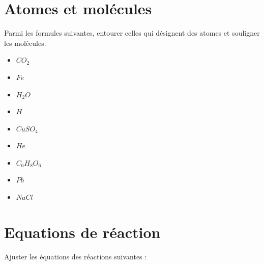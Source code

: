 \documentclass[a4paper,11pt]{exam}
\begin{document}
\section{Atomes et molécules}

Parmi les formules suivantes, entourer celles qui désignent des atomes et souligner les molécules.

\begin{multicols}{3}
	\begin{itemize}
		\item $CO_2$
		\item $Fe$
		\item $H_2O$
		\item $H$
		\item $CuSO_4$
		\item $He$
		\item $C_6H_8O_6 $
		\item $Pb$
		\item $NaCl$
		
	\end{itemize}
\end{multicols}


\section{Equations de réaction}

Ajuster les équations des réactions suivantes :
\end{document}
